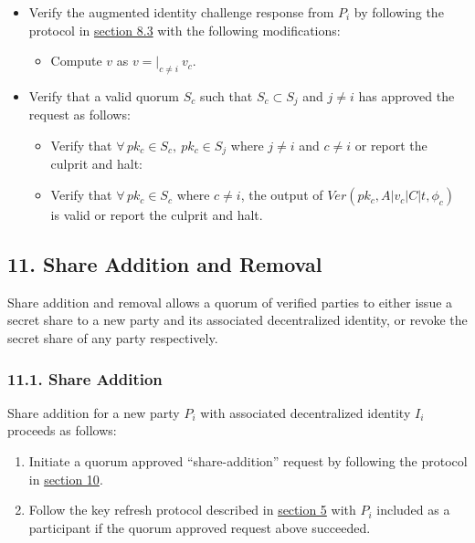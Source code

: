 \documentclass[
]{article}
\providecommand{\tightlist}{%
  \setlength{\itemsep}{0pt}\setlength{\parskip}{0pt}}
\begin{document}
\begin{enumerate}
  \begin{itemize}
  \tightlist
  \item
    Verify the augmented identity challenge response from \(P_i\) by
    following the protocol in
    \protect\hyperlink{identity-challenge-verification}{section 8.3}
    with the following modifications:

    \begin{itemize}
    \tightlist
    \item
      Compute \(v\) as \(v = | _{c \neq i} \: v_c\).
    \end{itemize}
  \item
    Verify that a valid quorum \(S_c\) such that \(S_c \subset S_j\) and
    \(j \neq i\) has approved the request as follows:

    \begin{itemize}
    \tightlist
    \item
      Verify that \(\forall \, pk_c \in S_c , \: pk_c \in S_j\) where
      \(j \neq i\) and \(c \neq i\) or report the culprit and halt:
    \item
      Verify that \(\forall \, pk_c \in S_c\) where \(c \neq i\), the
      output of \(Ver(pk_c, A | v_c | C | t, \phi _c)\) is valid or
      report the culprit and halt.
    \end{itemize}
  \end{itemize}
\end{enumerate}

\hypertarget{share-addition-and-removal}{%
\subsection{11. Share Addition and
Removal}\label{share-addition-and-removal}}

Share addition and removal allows a quorum of verified parties to either
issue a secret share to a new party and its associated decentralized
identity, or revoke the secret share of any party respectively.

\hypertarget{share-addition}{%
\subsubsection{11.1. Share Addition}\label{share-addition}}

Share addition for a new party \(P_i\) with associated decentralized
identity \(I_i\) proceeds as follows:

\begin{enumerate}
\def\labelenumi{\arabic{enumi}.}
\tightlist
\item
  Initiate a quorum approved ``share-addition'' request by following the
  protocol in \protect\hyperlink{quorum-approved-request}{section 10}.
\item
  Follow the key refresh protocol described in
  \protect\hyperlink{key-refresh}{section 5} with \(P_i\) included as a
  participant if the quorum approved request above succeeded.
\end{enumerate}
\end{document}
